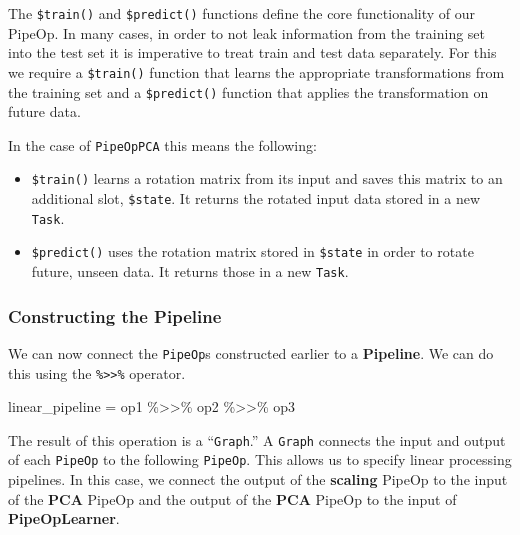 \documentclass[
]{scrbook}
\newenvironment{Shaded}{\begin{snugshade}}{\end{snugshade}}
\newcommand{\NormalTok}[1]{#1}
\newcommand{\OtherTok}[1]{\textcolor[rgb]{0.56,0.35,0.01}{#1}}
\newcommand{\SpecialCharTok}[1]{\textcolor[rgb]{0.00,0.00,0.00}{#1}}
\providecommand{\tightlist}{%
  \setlength{\itemsep}{0pt}\setlength{\parskip}{0pt}}
\renewenvironment{Shaded} {\begin{snugshade}\small} {\end{snugshade}}
\begin{document}
The \texttt{\$train()} and \texttt{\$predict()} functions define the core functionality of our PipeOp.
In many cases, in order to not leak information from the training set into the test set it is imperative to treat train and test data separately.
For this we require a \texttt{\$train()} function that learns the appropriate transformations from the training set and a \texttt{\$predict()} function that applies the transformation on future data.

In the case of \texttt{PipeOpPCA} this means the following:

\begin{itemize}
\tightlist
\item
  \texttt{\$train()} learns a rotation matrix from its input and saves this matrix to an additional slot, \texttt{\$state}.
  It returns the rotated input data stored in a new \texttt{Task}.
\item
  \texttt{\$predict()} uses the rotation matrix stored in \texttt{\$state} in order to rotate future, unseen data.
  It returns those in a new \texttt{Task}.
\end{itemize}

\hypertarget{constructing-the-pipeline}{%
\subsubsection{Constructing the Pipeline}\label{constructing-the-pipeline}}

We can now connect the \texttt{PipeOp}s constructed earlier to a \textbf{Pipeline}.
We can do this using the \texttt{\%\textgreater{}\textgreater{}\%} operator.

\begin{Shaded}
\begin{Highlighting}[]
\NormalTok{linear\_pipeline }\OtherTok{=}\NormalTok{ op1 }\SpecialCharTok{\%\textgreater{}\textgreater{}\%}\NormalTok{ op2 }\SpecialCharTok{\%\textgreater{}\textgreater{}\%}\NormalTok{ op3}
\end{Highlighting}
\end{Shaded}

The result of this operation is a ``\texttt{Graph}.''
A \texttt{Graph} connects the input and output of each \texttt{PipeOp} to the following \texttt{PipeOp}.
This allows us to specify linear processing pipelines.
In this case, we connect the output of the \textbf{scaling} PipeOp to the input of the \textbf{PCA} PipeOp and the output of the \textbf{PCA} PipeOp to the input of \textbf{PipeOpLearner}.
\end{document}
